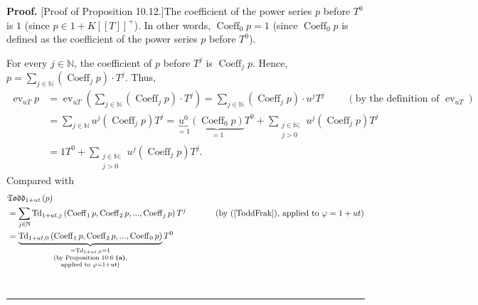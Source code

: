 \documentclass[numbers=enddot,12pt,final,onecolumn,notitlepage]{scrartcl}%
\newenvironment{proof}[1][Proof]{\noindent\textbf{#1.} }{\ \rule{0.5em}{0.5em}}
\begin{document}
\begin{proof}
[Proof of Proposition 10.12.]The coefficient of the power series $p$ before
$T^{0}$ is $1$ (since $p\in1+K\left[  \left[  T\right]  \right]  ^{+}$). In
other words, $\operatorname*{Coeff}\nolimits_{0}p=1$ (since
$\operatorname*{Coeff}\nolimits_{0}p$ is defined as the coefficient of the
power series $p$ before $T^{0}$).

For every $j\in\mathbb{N}$, the coefficient of $p$ before $T^{j}$ is
$\operatorname*{Coeff}\nolimits_{j}p$. Hence, $p=\sum\limits_{j\in\mathbb{N}%
}\left(  \operatorname*{Coeff}\nolimits_{j}p\right)  \cdot T^{j}$. Thus,
\begin{align*}
\operatorname*{ev}\nolimits_{uT}p  &  =\operatorname*{ev}\nolimits_{uT}\left(
\sum\limits_{j\in\mathbb{N}}\left(  \operatorname*{Coeff}\nolimits_{j}%
p\right)  \cdot T^{j}\right)  =\sum\limits_{j\in\mathbb{N}}\left(
\operatorname*{Coeff}\nolimits_{j}p\right)  \cdot u^{j}T^{j}%
\ \ \ \ \ \ \ \ \ \ \left(  \text{by the definition of }\operatorname*{ev}%
\nolimits_{uT}\right) \\
&  =\sum_{j\in\mathbb{N}}u^{j}\left(  \operatorname*{Coeff}\nolimits_{j}%
p\right)  T^{j}=\underbrace{u^{0}}_{=1}\underbrace{\left(
\operatorname*{Coeff}\nolimits_{0}p\right)  }_{=1}T^{0}+\sum_{\substack{j\in
\mathbb{N};\\j>0}}u^{j}\left(  \operatorname*{Coeff}\nolimits_{j}p\right)
T^{j}\\
&  =1T^{0}+\sum_{\substack{j\in\mathbb{N};\\j>0}}u^{j}\left(
\operatorname*{Coeff}\nolimits_{j}p\right)  T^{j}.
\end{align*}
Compared with%
\begin{align*}
&  \mathfrak{Todd}_{1+ut}\left(  p\right) \\
&  =\sum_{j\in\mathbb{N}}\operatorname*{Td}\nolimits_{1+ut,j}\left(
\operatorname*{Coeff}\nolimits_{1}p,\operatorname*{Coeff}\nolimits_{2}%
p,...,\operatorname*{Coeff}\nolimits_{j}p\right)  T^{j}%
\ \ \ \ \ \ \ \ \ \ \left(  \text{by (\ref{ToddFrak}), applied to }%
\varphi=1+ut\right) \\
&  =\underbrace{\operatorname*{Td}\nolimits_{1+ut,0}\left(
\operatorname*{Coeff}\nolimits_{1}p,\operatorname*{Coeff}\nolimits_{2}%
p,...,\operatorname*{Coeff}\nolimits_{0}p\right)  }%
_{\substack{=\operatorname*{Td}\nolimits_{1+ut,0}=1\\\text{(by Proposition
10.6 \textbf{(a)},}\\\text{applied to }\varphi=1+ut\text{)}}}T^{0}\\

\end{align*}
\end{proof}
\end{document}

